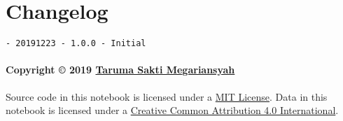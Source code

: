 \documentclass[11pt]{article}
\begin{document}
    \hypertarget{changelog}{%
\section{Changelog}\label{changelog}}

\begin{verbatim}
- 20191223 - 1.0.0 - Initial
\end{verbatim}

\hypertarget{copyright-2019-taruma-sakti-megariansyah}{%
\paragraph{\texorpdfstring{Copyright © 2019
\href{https://taruma.github.io}{Taruma Sakti
Megariansyah}}{Copyright © 2019 Taruma Sakti Megariansyah}}\label{copyright-2019-taruma-sakti-megariansyah}}

Source code in this notebook is licensed under a
\href{https://choosealicense.com/licenses/mit/}{MIT License}. Data in
this notebook is licensed under a
\href{https://creativecommons.org/licenses/by/4.0/}{Creative Common
Attribution 4.0 International}.


    
    
    
\end{document}

